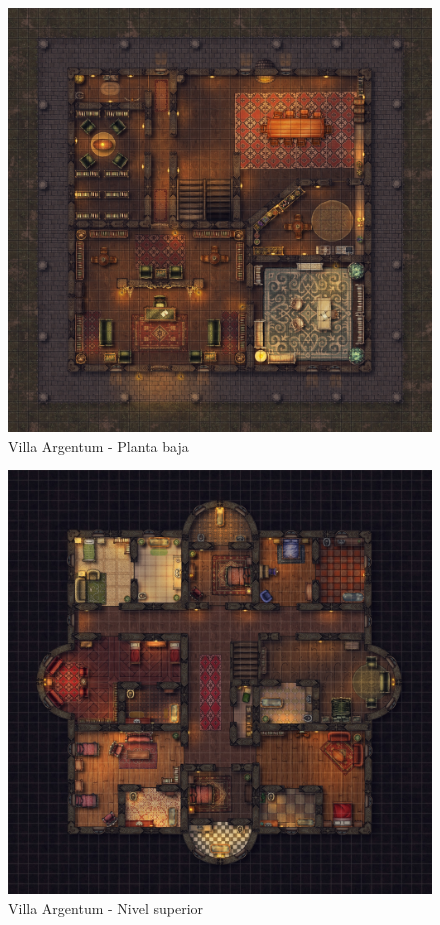 \documentclass[10pt,twoside,twocolumn,openany]{dndbook}
\begin{document}


\begin{figure}[hb!]
  \centering
  \includegraphics[width=\textwidth]{maps/villa-argentum-pb.jpg}
  \caption{Villa Argentum - Planta baja}
  \label{fig:vapb}
\end{figure}



\begin{figure}[hb!]
  \centering
  \includegraphics[width=\textwidth]{maps/villa-argentum-l1.jpg}
  \caption{Villa Argentum - Nivel superior}
  \label{fig:val1}
\end{figure}
\end{document}
